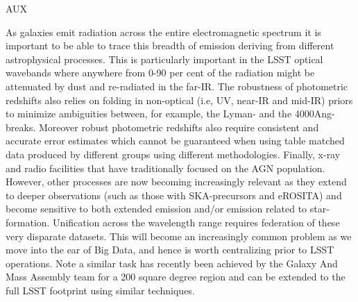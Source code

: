 {\begin{tasklist}{AUX}
\begin{task}
{\begin{enumerate}
\end{enumerate}
As galaxies emit radiation across the entire electromagnetic spectrum it is important to be able to trace this breadth of emission deriving from different astrophysical processes. This is particularly important in the LSST optical wavebands where anywhere from 0-90 per cent of the radiation might be attenuated by dust and re-radiated in the far-IR. 
The robustness of photometric redshifts also relies on folding in non-optical (i.e, UV, near-IR and mid-IR) priors to minimize ambiguities between, for example, the Lyman- and the 4000Ang-breaks. Moreover robust photometric redshifts also require consistent and accurate error estimates which cannot be guaranteed when using table matched data produced by different groups using different methodologies.
Finally, x-ray and radio facilities that have traditionally focused on the AGN population. However, other processes are now becoming increasingly relevant as they extend to deeper observations (such as those with SKA-precursors and eROSITA) and become sensitive to both extended emission and/or emission related to star-formation. Unification across the wavelength range requires federation of these very disparate datasets. This will become an increasingly common problem as we move into the ear of Big Data, and hence is worth centralizing prior to LSST operations.
Note a similar task has recently been achieved by the Galaxy And Mass Assembly team for a 200 square degree region \citep[see][and http://www/gama-survey.org/]{driver2016a} and can be extended to the full LSST footprint using similar techniques.
}
~\\
\end{task}


\end{tasklist}}
